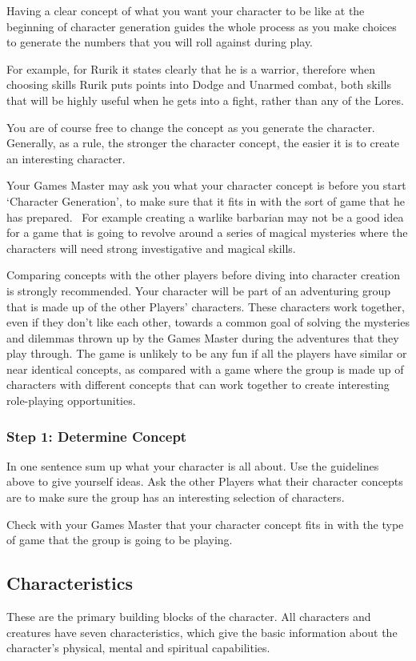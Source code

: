 Having a clear concept of what you want your character to be like at the beginning of character generation guides the whole process as you make choices to generate the numbers that you will roll against during play.

For example, for Rurik it states clearly that he is a warrior, therefore when choosing skills Rurik puts points into Dodge and Unarmed combat, both skills that will be highly useful when he gets into a fight, rather than any of the Lores.

You are of course free to change the concept as you generate the character. Generally, as a rule, the stronger the character concept, the easier it is to create an interesting character.

Your Games Master may ask you what your character concept is before you start `Character Generation', to make sure that it fits in with the sort of game that he has prepared.  For example creating a warlike barbarian may not be a good idea for a game that is going to revolve around a series of magical mysteries where the characters will need strong investigative and magical skills.

Comparing concepts with the other players before diving into character creation is strongly recommended. Your character will be part of an adventuring group that is made up of the other Players’ characters. These characters work together, even if they don’t like each other, towards a common goal of solving the mysteries and dilemmas thrown up by the Games Master during the adventures that they play through. The game is unlikely to be any fun if all the players have similar or near identical concepts, as compared with a game where the group is made up of characters with different concepts that can work together to create interesting role-playing opportunities.


\subsubsection{Step 1: Determine Concept}
In one sentence sum up what your character is all about. Use the guidelines above to give yourself ideas. Ask the other Players what their character concepts are to make sure the group has an interesting selection of characters.

Check with your Games Master that your character concept fits in with the type of game that the group is going to be playing.


\subsection{Characteristics}
These are the primary building blocks of the character. All characters and creatures have seven characteristics, which give the basic information about the character’s physical, mental and spiritual capabilities.

